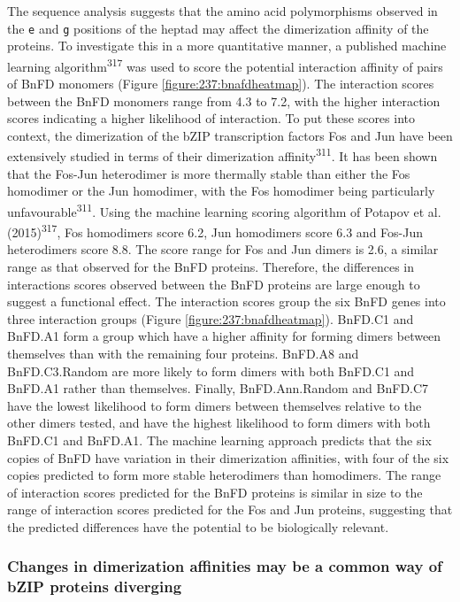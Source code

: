 \documentclass[12pt,]{book}
\begin{document}
The sequence analysis suggests that the amino acid polymorphisms
observed in the \texttt{e} and \texttt{g} positions of the heptad may
affect the dimerization affinity of the proteins. To investigate this in
a more quantitative manner, a published machine learning
algorithm\textsuperscript{317} was used to score the potential
interaction affinity of pairs of BnFD monomers (Figure
\ref{figure:237:bnafdheatmap}). The interaction scores between the BnFD
monomers range from 4.3 to 7.2, with the higher interaction scores
indicating a higher likelihood of interaction. To put these scores into
context, the dimerization of the bZIP transcription factors Fos and Jun
have been extensively studied in terms of their dimerization
affinity\textsuperscript{311}. It has been shown that the Fos-Jun
heterodimer is more thermally stable than either the Fos homodimer or
the Jun homodimer, with the Fos homodimer being particularly
unfavourable\textsuperscript{311}. Using the machine learning scoring
algorithm of Potapov et al. (2015)\textsuperscript{317}, Fos homodimers
score 6.2, Jun homodimers score 6.3 and Fos-Jun heterodimers score 8.8.
The score range for Fos and Jun dimers is 2.6, a similar range as that
observed for the BnFD proteins. Therefore, the differences in
interactions scores observed between the BnFD proteins are large enough
to suggest a functional effect. The interaction scores group the six
BnFD genes into three interaction groups (Figure
\ref{figure:237:bnafdheatmap}). BnFD.C1 and BnFD.A1 form a group which
have a higher affinity for forming dimers between themselves than with
the remaining four proteins. BnFD.A8 and BnFD.C3.Random are more likely
to form dimers with both BnFD.C1 and BnFD.A1 rather than themselves.
Finally, BnFD.Ann.Random and BnFD.C7 have the lowest likelihood to form
dimers between themselves relative to the other dimers tested, and have
the highest likelihood to form dimers with both BnFD.C1 and BnFD.A1. The
machine learning approach predicts that the six copies of BnFD have
variation in their dimerization affinities, with four of the six copies
predicted to form more stable heterodimers than homodimers. The range of
interaction scores predicted for the BnFD proteins is similar in size to
the range of interaction scores predicted for the Fos and Jun proteins,
suggesting that the predicted differences have the potential to be
biologically relevant.

\subsubsection{Changes in dimerization affinities may be a common way of
bZIP proteins
diverging}\label{changes-in-dimerization-affinities-may-be-a-common-way-of-bzip-proteins-diverging}
\end{document}
